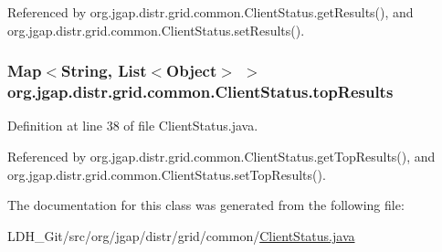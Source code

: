 Referenced by org.\-jgap.\-distr.\-grid.\-common.\-Client\-Status.\-get\-Results(), and org.\-jgap.\-distr.\-grid.\-common.\-Client\-Status.\-set\-Results().

\hypertarget{classorg_1_1jgap_1_1distr_1_1grid_1_1common_1_1_client_status_a2223b5599789c9241742767afb0317bd}{
\subsubsection[{top\-Results}]{\setlength{\rightskip}{0pt plus 5cm}Map$<$String, List$<$Object$>$ $>$ org.\-jgap.\-distr.\-grid.\-common.\-Client\-Status.\-top\-Results\hspace{0.3cm}{\ttfamily [private]}}}\label{classorg_1_1jgap_1_1distr_1_1grid_1_1common_1_1_client_status_a2223b5599789c9241742767afb0317bd}


Definition at line 38 of file Client\-Status.\-java.



Referenced by org.\-jgap.\-distr.\-grid.\-common.\-Client\-Status.\-get\-Top\-Results(), and org.\-jgap.\-distr.\-grid.\-common.\-Client\-Status.\-set\-Top\-Results().



The documentation for this class was generated from the following file\-:\begin{DoxyCompactItemize}
\item 
L\-D\-H\-\_\-\-Git/src/org/jgap/distr/grid/common/\hyperlink{_client_status_8java}{Client\-Status.\-java}\end{DoxyCompactItemize}

